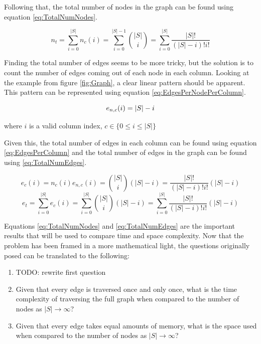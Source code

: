 \documentclass{article}
\begin{document}
Following that, the total number of nodes in the graph can be found using equation \ref{eq:TotalNumNodes}.

\begin{equation}
    n_t=\sum_{i=0}^{|S|}n_c(i)=\sum_{i=0}^{|S|-1}\binom{|S|}{i}=\sum_{i=0}^{|S|}\frac{|S|!}{(|S|-i)!i!}
    \label{eq:TotalNumNodes}
\end{equation}

Finding the total number of edges seems to be more tricky, but the solution is to count the number of edges coming out of each node in each column. Looking at the example from figure \ref{fig:Graph}, a clear linear pattern should be apparent. This pattern can be represented using equation \ref{eq:EdgesPerNodePerColumn}.

\begin{equation}
    e_{n,c}(i)=|S|-i\\
    \label{eq:EdgesPerNodePerColumn}
\end{equation}
\centerline{where $i$ is a valid column index, $c\in \{ 0\le i\le |S|\}$}

Given this, the total number of edges in each column can be found using equation \ref{eq:EdgesPerColumn} and the total number of edges in the graph can be found using \ref{eq:TotalNumEdges}.

\begin{equation}
    e_c(i)=n_c(i)e_{n,c}(i)=\binom{|S|}{i}\left(|S|-i\right)=
    \frac{|S|!}{(|S|-i)!i!}\left(|S|-i\right)
    \label{eq:EdgesPerColumn}
\end{equation}
\begin{equation}
    e_t=\sum_{i=0}^{|S|}e_c(i)=
    \sum_{i=0}^{|S|}\binom{|S|}{i}\left(|S|-i\right)=
    \sum_{i=0}^{|S|}\frac{|S|!}{(|S|-i)!i!}\left(|S|-i\right)
    \label{eq:TotalNumEdges}
\end{equation}

Equations \ref{eq:TotalNumNodes} and \ref{eq:TotalNumEdges} are the important results that will be used to compare time and space complexity. Now that the problem has been framed in a more mathematical light, the questions originally posed can be translated to the following:

\begin{enumerate}
    \item TODO: rewrite first question
    \item Given that every edge is traversed once and only once, what is the time complexity of traversing the full graph when compared to the number of nodes as $|S|\to\infty$?
    \item Given that every edge takes equal amounts of memory, what is the space used when compared to the number of nodes as $|S|\to\infty$?
\end{enumerate}
\end{document}
